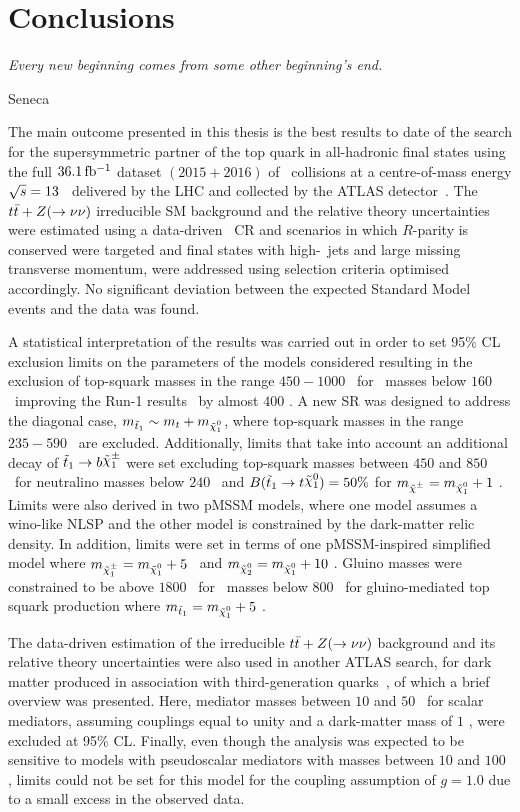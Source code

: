 \chapter*{Conclusions}
\epigraph{\emph{Every new beginning comes from some other beginning's end.}} {Seneca}


The main outcome presented in this thesis is the best results to date of the search for the supersymmetric partner of the top quark in all-hadronic final states using the full $36.1\, \mbox{fb$^{-1}$}$ dataset $(2015+2016)$ of \pp\ collisions at a centre-of-mass energy $\sqrt{s} = 13$ \TeV\ delivered by the \ac{LHC} and collected by the \ac{ATLAS} detector~\cite{stop0L}. The $t\bar{t}+Z (\rightarrow \nu \nu)$ irreducible \ac{SM} background and the relative theory uncertainties were estimated using a data-driven \ttgamma\ \ac{CR} and scenarios in which $R$-parity is conserved were targeted and final states with high-\pt\ jets and large missing transverse momentum, were addressed using selection criteria optimised accordingly. No significant deviation between the expected Standard Model events and the data was found.

A statistical interpretation of the results was carried out in order to set 95\% \ac{CL} exclusion limits on the parameters of the models considered resulting in the exclusion of top-squark masses in the range $450-1000$ \GeV\ for \ninoone\ masses below $160$ \GeV\ improving the Run-1 results~\cite{stop0LRun1} by almost $400$ \GeV. A new \ac{SR} was designed to address the diagonal case, $m_{\stopone} \sim m_t + m_{\ninoone}$, where top-squark masses in the range $235-590$ \GeV\ are excluded. Additionally, limits that take into account an additional decay of $\stopone \to b \chinoonepm$ were set excluding top-squark masses between $450$ and $850$ \GeV\ for neutralino masses below $240$ \GeV\ and $B(\stopone \to t \ninoone) = 50\%$ for $m_{\chinopm} = m_{\ninoone} + 1$ \GeV. Limits were also derived in two pMSSM models, where one model assumes a wino-like \ac{NLSP} and the other model is constrained by the dark-matter relic density. In addition, limits were set in terms of one \ac{pMSSM}-inspired simplified model where $m_{\chinoonepm} = m_{\ninoone} + 5$ \GeV\ and $m_{\ninotwo} = m_{\ninoone} + 10$ \GeV. Gluino masses were constrained to be above $1800$ \GeV\ for \stopone\ masses below $800$ \GeV\ for gluino-mediated top squark production where $m_{\stopone} = m_{\ninoone} + 5$ \GeV. 

The data-driven estimation of the irreducible $t\bar{t}+Z (\rightarrow \nu \nu)$ background and its relative theory uncertainties were also used in another ATLAS search, for dark matter produced in association with third-generation quarks~\cite{DMhf}, of which a brief overview was presented. Here, mediator masses between $10$ and $50$ \GeV\ for scalar mediators, assuming couplings equal to unity and a dark-matter mass of $1$ \GeV, were excluded at 95\% CL. Finally, even though the analysis was expected to be sensitive to models with pseudoscalar mediators with masses between $10$ and $100$ \GeV, limits could not be set for this model for the coupling assumption of $g = 1.0$ due to a small excess in the observed data.	